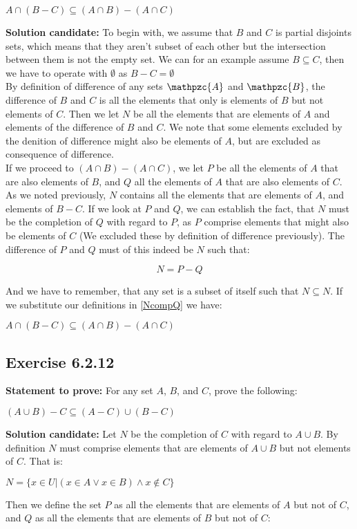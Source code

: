 \documentclass{report}
\newcommand{\cent}[1]{\begin{center}#1\end{center}}
\newcommand{\mat}[2]{\begin{equation} \label{#2}#1\end{equation}}
\newcommand{\In}{\! \in \!}
\newcommand{\script}[1]{\mathpzc{#1}}
\newcommand{\Prove}{\textbf{Statement to prove: }}
\newcommand{\solution}{\textbf{Solution candidate: }}
\newcommand{\QED}{\boxed{}}
\newcommand{\Exercise}[1]{\subsection{Exercise #1}}
\begin{document}
	\cent{$ A \cap (B-C) \subseteq (A \cap B) - (A \cap C) $}
	
	\solution
	To begin with, we assume that $B$ and $C$ is partial disjoints sets, which means that they aren't subset of each other but the intersection between them is not the empty set. We can for an example assume $B \subseteq C$, then we have to operate with $\emptyset$ as $B - C = \emptyset$\\
	
	By definition of difference of any sets $\script{A}$ and $ \script{B} $, the difference of $B$ and $C$ is all the elements that only is elements of $B$ but not elements of $C$. Then we let $N$ be all the elements that are elements of $A$ and elements of the difference of $B$ and $C$. We note that some elements excluded by the denition of difference might also be elements of $A$, but are excluded as consequence of difference.\\
	
	If we proceed to $(A \cap B) - (A \cap C)$, we let $P$ be all the elements of $A$ that are also elements of $B$, and $Q$ all the elements of $A$ that are also elements of $C$. As we noted previously, $N$ contains all the elements that are elements of $A$, and elements of $B -C$. If we look at $P$ and $Q$, we can establish the fact, that $N$ must be the completion of $Q$ with regard to $P$, as $P$ comprise elements that might also be elements of $C$ (We excluded these by definition of difference previously). The difference of $P$ and $Q$ must of this indeed be $N$ such that:
	
	\mat{N = P-Q}{NcompQ}
	
	And we have to remember, that any set is a subset of itself such that  $N \subseteq N$. If we substitute our definitions in \eqref{NcompQ} we have:
	\cent{$ A \cap (B-C) \subseteq (A \cap B) - (A \cap C) $}
	
	\QED
	
	\Exercise{6.2.12}
	
	\Prove
	For any set $A$, $B$, and $C$, prove the following:
	
	\cent{$(A \cup B) - C \subseteq (A-C) \cup (B-C)$}
	
	\solution
	Let $N$ be the completion of $C$ with regard  to $A\cup B$. By definition $N$ must comprise elements that are elements of $A \cup B$ but not elements of $C$. That is:
	
	\cent{$ N = \{x \In U | (x \In A \vee x \In B) \wedge x \notin C\} $}
	
	Then we define the set $P$ as all the elements that are elements of $A$ but not of $C$, and $Q$ as all the elements that are elements of $B$ but not of $C$:
	
\end{document}

